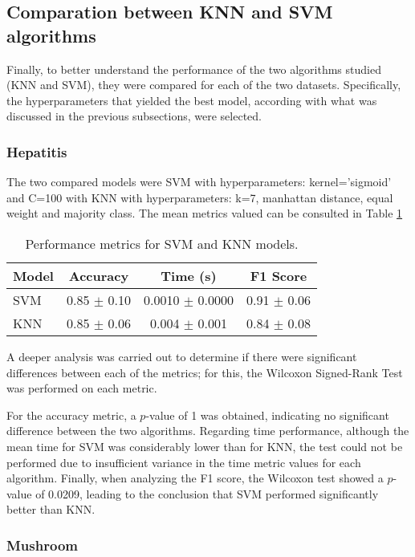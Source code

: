 \subsection{Comparation between KNN and SVM algorithms}
Finally, to better understand the performance of the two algorithms studied (KNN and SVM), they were compared for each of the two datasets. Specifically, the hyperparameters that yielded the best model, according with what was discussed in the previous subsections, were selected.
\subsubsection{Hepatitis}

The two compared models were SVM with hyperparameters: kernel='sigmoid' and C=100 with KNN with hyperparameters: k=7, manhattan distance, equal weight and majority class. The mean metrics valued can be consulted in Table \ref{tabsvm-knn-hep} \newline

\begin{table}[h!]
\centering
\begin{tabular}{|l|c|c|c|}
\hline
\textbf{Model} & \textbf{Accuracy} & \textbf{Time (s)} & \textbf{F1 Score} \\
\hline
SVM & 0.85 $\pm$ 0.10 & 0.0010 $\pm$ 0.0000 & 0.91 $\pm$ 0.06 \\
\hline
KNN & 0.85 $\pm$ 0.06 & 0.004 $\pm$ 0.001 & 0.84 $\pm$ 0.08 \\
\hline
\end{tabular}
\caption{Performance metrics for SVM and KNN models.}
\label{tabsvm-knn-hep}
\end{table}

A deeper analysis was carried out to determine if there were significant differences between each of the metrics; for this, the Wilcoxon Signed-Rank Test was performed on each metric. \newline

For the accuracy metric, a $p$-value of 1 was obtained, indicating no significant difference between the two algorithms. Regarding time performance, although the mean time for SVM was considerably lower than for KNN, the test could not be performed due to insufficient variance in the time metric values for each algorithm. Finally, when analyzing the F1 score, the Wilcoxon test showed a $p$-value of 0.0209, leading to the conclusion that SVM performed significantly better than KNN.
\subsubsection{Mushroom}

